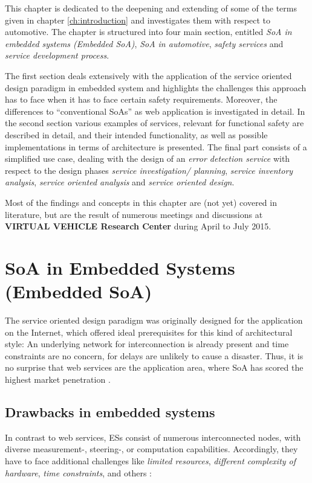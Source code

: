 \label{ch:methods}
This chapter is dedicated to the deepening and extending of some of the terms given in chapter \ref{ch:introduction} and investigates them with respect to automotive. The chapter is structured into four main section, entitled \emph{SoA in embedded systems (Embedded SoA)}, \emph{SoA in automotive}, \emph{safety services} and \emph{service development process}. 

The first section deals extensively with the application of the service oriented design paradigm in embedded system and highlights the challenges this approach has to face when it has to face certain safety requirements. Moreover, the differences to ``conventional SoAs'' as web application is investigated in detail. In the second section various examples of services, relevant for functional safety are described in detail, and their intended functionality, as well as possible implementations in terms of architecture is presented. The final part consists of a simplified use case, dealing with the design of an \emph{error detection service} with respect to the design phases \emph{service investigation/ planning}, \emph{service inventory analysis}, \emph{service oriented analysis} and \emph{service oriented design}.

Most of the findings and concepts in this chapter are (not yet) covered in literature, but are the result of numerous meetings and discussions at \textbf{VIRTUAL VEHICLE Research Center} during April to July 2015.









\section{SoA in Embedded Systems (Embedded SoA)}
\label{sec:soa-in-embedded-systems}

The service oriented design paradigm was originally designed for the application on the Internet, which offered ideal prerequisites for this kind of architectural style: An underlying network for interconnection is already present and time constraints are no concern, for delays are unlikely to cause a disaster. Thus, it is no surprise that web services are the application area, where SoA has scored the highest market penetration \cite{rodrigues2011} \cite{buckl}.


\subsection{Drawbacks in embedded systems}
In contrast to web services, ESs consist of numerous interconnected nodes, with diverse measurement-, steering-, or computation capabilities. Accordingly, they have to face additional challenges like \emph{limited resources}, \emph{different complexity of hardware}, \emph{time constraints}, and others \cite{scholz} \cite{sommer}: 

